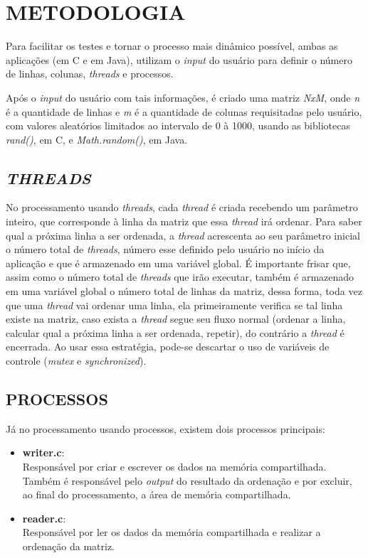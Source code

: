 \section{\normalsize METODOLOGIA}
	Para facilitar os testes e tornar o processo mais dinâmico possível, ambas as aplicações (em C e em Java), utilizam o \textit{input} do usuário para definir o número de linhas, colunas, \textit{threads} e processos.
	
	Após o \textit{input} do usuário com tais informações, é criado uma matriz \textit{NxM}, onde \textit{n} é a quantidade de linhas e \textit{m} é a quantidade de colunas requisitadas pelo usuário, com valores aleatórios limitados ao intervalo de 0 à 1000, usando as bibliotecas \textit{rand()}, em C, e \textit{Math.random()}, em Java.
	
	\subsection{\normalsize \textit{THREADS}}
	
	No processamento usando \textit{threads}, cada \textit{thread} é criada recebendo um parâmetro inteiro, que corresponde à linha da matriz que essa \textit{thread} irá ordenar. Para saber qual a próxima linha a ser ordenada, a \textit{thread} acrescenta ao seu parâmetro inicial o número total de \textit{threads}, número esse definido pelo usuário no início da aplicação e que é armazenado em uma variável global. É importante frisar que, assim como o número total de \textit{threads} que irão executar, também é armazenado em uma variável global o número total de linhas da matriz, dessa forma, toda vez que uma \textit{thread} vai ordenar uma linha, ela primeiramente verifica se tal linha existe na matriz, caso exista a \textit{thread} segue seu fluxo normal (ordenar a linha, calcular qual a próxima linha a ser ordenada, repetir), do contrário a \textit{thread} é encerrada. Ao usar essa estratégia, pode-se descartar o uso de variáveis de controle (\textit{mutex} e \textit{synchronized}).
	
	\subsection{\normalsize PROCESSOS}
	Já no processamento usando processos, existem dois processos principais:
		\begin{itemize}
			\item \textbf{writer.c}:\\
				Responsável por criar e escrever os dados na memória compartilhada. Também é responsável pelo \textit{output} do resultado da ordenação e por excluir, ao final do processamento, a área de memória compartilhada.
			
			\item \textbf{reader.c}:\\
				Responsável por ler os dados da memória compartilhada e realizar a ordenação da matriz.
		\end{itemize}
		
